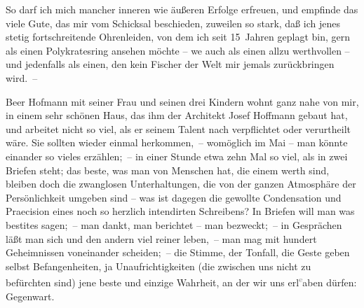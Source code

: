 \pstart
           So darf ich \introOben{}mich\introOben{} mancher inneren wie äußeren Erfolge
               erfreuen, und empfinde das viele Gute, das mir vom Schicksal beschieden, zuweilen so
               stark, daß ich jenes stetig fortschreitende Ohrenleiden, von dem ich seit 15 Jahren
               geplagt bin, gern als einen Polykratesring ansehen möchte – we{\geminationn}{ }\strikeout{\textcolor{gray}{ich}} auch als einen allzu werthvollen – und jedenfalls als einen, den kein Fischer
               der Welt mir jemals zurückbringen wird. –\pend
           
\pstart
           {\pb}Beer Hofmann mit seiner Frau und seinen drei Kindern wohnt ganz nahe
					von mir, in einem sehr schönen Haus, das ihm der Architekt Josef
                  Hoffmann gebaut hat, und arbeitet nicht so viel, als er seinem Talent nach
               verpflichtet oder verurtheilt wäre. Sie sollten wieder einmal herkommen, – womöglich
               im Mai – man könnte einander so vieles erzählen; – in einer Stunde etwa zehn Mal so
               viel, als in zwei Briefen steht; das beste, was man von Menschen hat, die einem werth
               sind, bleiben doch die zwanglosen Unterhaltungen, die von der ganzen Atmosphäre der
               Persönlichkeit umgeben sind – was ist dagegen die gewollte Condensation und
               Praecision eines noch so herzlich intendirten Schreibens? {\pb}In Briefen will man was besti{\geminationm}tes sagen; – man dankt, man berichtet – man bezweckt; –
               in Gesprächen läßt man sich und den andern viel reiner leben, – man mag mit hundert
               Geheimnissen voneinander scheiden; – die Stimme, der Tonfall, die Geste geben selbst
               Befangenheiten, ja Unaufrichtigkeiten (die zwischen uns nicht zu befürchten sind)
               jene beste und einzige Wahrheit, an der wir uns erl\substVorne{}\textsuperscript{\textcolor{gray}{e}}\substDazwischen{}a\substHinten{}ben dürfen: Gegenwart.\pend
           
